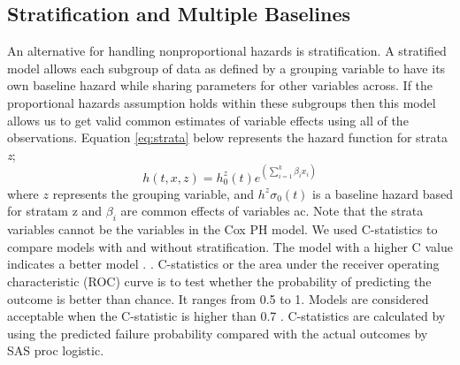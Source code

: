 \documentclass[12pt,letterpaper]{article}
\begin{document}
\subsection{Stratification and Multiple Baselines}
An alternative for handling nonproportional hazards is stratification.  A stratified model allows each subgroup of data as defined by a grouping variable to have its own baseline hazard while sharing parameters for other variables across. If the proportional hazards assumption holds within these subgroups then this model allows us to get valid common estimates of variable effects using all of the observations. Equation \ref{eq:strata} below represents the hazard function for strata {\it z};
\begin{equation}
	\label{eq:strata}
	h(t,x,z)=h^z_0(t)e^{(\sum_{i=1}^{k}\beta_ix_i)}
\end{equation}
where $z$ represents the grouping variable, and $h^z\sigma_0(t)$ is a baseline hazard based for stratam z and $\beta_i$ are common effects of variables ac. Note that the strata variables cannot be the variables in the Cox PH model.
We used C-statistics to compare models with and without stratification. The model with a higher C value indicates a better model \citep{lemke2012}. . C-statistics or the area under the receiver operating characteristic (ROC) curve is to test whether the probability of predicting the outcome is better than chance. It ranges from 0.5 to 1.  Models are considered acceptable when the C-statistic is higher than 0.7 \citep{hosmer2013}. C-statistics are calculated by using the predicted failure probability compared with the actual outcomes by SAS proc logistic.
\end{document}
